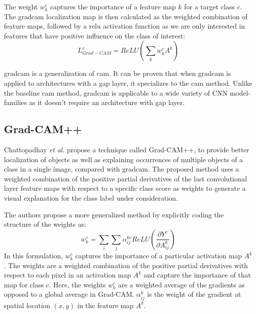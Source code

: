 The weight $w_{k}^{c}$ captures the importance of a feature map $k$ for a target class $c$. The \acrshort{gradcam} localization map is then calculated as the weighted combination of feature maps, followed by a \acrshort{relu} activation function as we are only interested in features that have positive influence on the class of interest:
\begin{equation}
    L_{Grad-CAM}^{c} = ReLU \left( \sum_{k}w_{k}^{c} A^{k} \right)
\end{equation}

\acrshort{gradcam} is a generalization of \acrshort{cam}. It can be proven that when \acrshort{gradcam} is applied to architectures with a \acrshort{gap} layer, it specializes to the \acrshort{cam} method. Unlike the baseline \acrshort{cam} method, \acrshort{gradcam} is applicable to a wide variety of CNN model-families as it doesn't require an architecture with \acrshort{gap} layer.

\subsection{Grad-CAM++}
Chattopadhay \textit{et al.} \cite{chattopadhay2018grad} propose a technique called Grad-CAM++, to provide better localization of objects
as well as explaining occurrences of multiple objects of a class in a single image, compared with \acrshort{gradcam}. The proposed method uses a weighted combination of the positive partial derivatives of the last convolutional layer feature maps with respect to a specific class score as weights to generate a visual explanation for the class label under consideration.

The authors propose a more generalized method by explicitly coding the structure of the weights as:
\begin{equation}
    w_{k}^{c} = \sum_{i} \sum_{j} \alpha_{ij}^{kc} \dot ReLU \left( \frac{\partial{Y^c}}{\partial{A_{ij}^{k}}} \right)
\end{equation}
In this formulation, $w_{k}^{c}$ captures the importance of a particular activation map $A^k$. The weights are a weighted combination of the positive
partial derivatives with respect to each pixel in an activation map $A^k$ and capture the importance of that map for class $c$. Here, the weights $w_k^c$ are a weighted average of the gradients as opposed to a global average in Grad-CAM. $\alpha_{ij}^{k}$ is the weight of the gradient at spatial location $(x,y)$ in the feature map $A^k$. 

